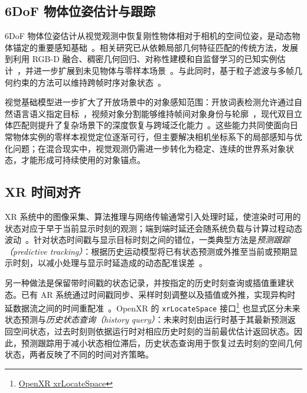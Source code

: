 \documentclass[review]{vgtc}
\begin{document}
\subsection{6DoF 物体位姿估计与跟踪}

6DoF 物体位姿估计从视觉观测中恢复刚性物体相对于相机的空间位姿，是动态物体锚定的重要感知基础~\cite{aguirrezabal2026survey}。相关研究已从依赖局部几何特征匹配的传统方法，发展到利用 RGB-D 融合、稠密几何回归、对称性建模和自监督学习的已知实例估计~\cite{densefusion2019,epos2020,gdrnet2021,self6d2020}，并进一步扩展到未见物体与零样本场景~\cite{gen6d2022,megapose2022,lin2024sam6d,ornek2024foundpose,moon2025coop,foundationpose2024}。与此同时，基于粒子滤波与多帧几何约束的方法可以维持跨帧时序对象状态~\cite{poserbpf2021,bundletrack2021}。

视觉基础模型进一步扩大了开放场景中的对象感知范围：开放词表检测允许通过自然语言语义指定目标~\cite{owlvit2022,glip2022,groundingdino2025,yoloe2025}，视频对象分割能够维持帧间对象身份与轮廓~\cite{xmem2022,cutie2024}，现代双目立体匹配则提升了复杂场景下的深度恢复与跨域泛化能力~\cite{raftstereo2021,igevstereo2023,fastfoundationstereo2026}。这些能力共同使面向日常物体实例的零样本视觉定位逐渐可行，但主要解决相机坐标系下的局部感知与优化问题；在混合现实中，视觉观测仍需进一步转化为稳定、连续的世界系对象状态，才能形成可持续使用的对象锚点。

\subsection{XR 时间对齐}

XR 系统中的图像采集、算法推理与网络传输通常引入处理时延，使渲染时可用的状态对应于早于当前显示时刻的观测；端到端时延还会随系统负载与计算过程动态波动~\cite{diluca2010latency,mrloop2022,stauffert2020mtp}。针对状态时间戳与显示目标时刻之间的错位，一类典型方法是\emph{预测跟踪（predictive tracking）}：根据历史运动模型将已有状态预测或外推至当前或预期显示时刻，以减小处理与显示时延造成的动态配准误差~\cite{azuma1994improving,laviola2003double,pvt2023,yoon2022headmotion}。

另一种做法是保留带时间戳的状态记录，并按指定的历史时刻查询或插值重建状态。已有 AR 系统通过时间戳同步、采样时刻调整以及插值或外推，实现异构时延数据流之间的时间重配准~\cite{jacobs1997latency}。OpenXR 的 \texttt{xrLocateSpace} 接口\footnote{\href{https://registry.khronos.org/OpenXR/specs/1.1/man/html/xrLocateSpace.html}{OpenXR xrLocateSpace}} 也显式区分未来状态预测与\emph{历史状态查询（history query）}：未来时刻由运行时基于其最新预测返回空间状态，过去时刻则依据运行时对相应历史时刻的当前最优估计返回状态。因此，预测跟踪用于减小状态相位滞后，历史状态查询用于恢复过去时刻的空间几何状态，两者反映了不同的时间对齐策略。
\end{document}
